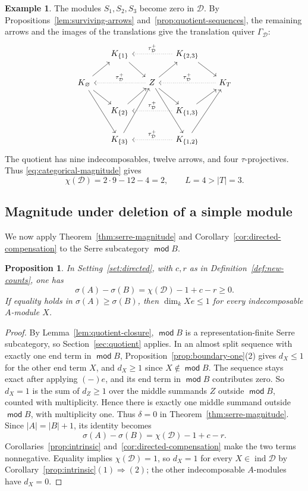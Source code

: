 \documentclass[a4paper,reqno,10pt]{amsart}
\newtheorem{proposition}[theorem]{Proposition}
\theoremstyle{definition}
\newtheorem{example}[theorem]{Example}
\numberwithin{equation}{section}
\DeclareMathOperator{\moduleCategory}{\mathsf{mod}}
\renewcommand{\mod}{\moduleCategory}
\DeclareMathOperator{\ind}{ind}
\newcommand{\cD}{\mathcal D}
\begin{document}
\begin{example}
The modules \(S_1,S_2,S_3\) become zero in \(\cD\). By
Propositions~\ref{lem:surviving-arrows} and~\ref{prop:quotient-sequences},
the remaining arrows and the images of the translations give the
translation quiver \(\Gamma_{\cD}\):
\[
\begin{tikzcd}[column sep=1.6em,row sep=1.7em]
 &K_{\{1\}}\arrow[dr]&&K_{\{2,3\}}\arrow[dr]
   \arrow[ll,dotted,"\tau_{\cD}^+"']&\\
 K_\varnothing\arrow[ur]\arrow[dr]\arrow[ddr]&&
 Z\arrow[ur]\arrow[dr]\arrow[ddr]\arrow[ll,dotted,"\tau_{\cD}^+"']&&
 K_T\arrow[ll,dotted,"\tau_{\cD}^+"']\\
 &K_{\{2\}}\arrow[ur]&&K_{\{1,3\}}\arrow[ur]
   \arrow[ll,dotted,"\tau_{\cD}^+"']&\\
 &K_{\{3\}}\arrow[uur]&&K_{\{1,2\}}\arrow[uur]
   \arrow[ll,dotted,"\tau_{\cD}^+"']&
\end{tikzcd}
\]
The quotient has nine indecomposables, twelve arrows, and four
\(\tau\)-projectives. Thus \eqref{eq:categorical-magnitude} gives
\[
 \chi(\cD)=2\cdot9-12-4=2,\qquad L=4>|T|=3.
\]
\end{example}
\subsection{Magnitude under deletion of a simple module}\label{subsec:deletion-proof}
We now apply Theorem~\ref{thm:serre-magnitude} and
Corollary~\ref{cor:directed-compensation} to the Serre subcategory
\(\mod B\).

\begin{proposition}\label{thm:directed-deletion}
In Setting~\ref{set:directed}, with \(c,r\) as in
Definition~\ref{def:new-counts}, one has
\begin{equation}\label{eq:directed-deletion}
 \sigma(A)-\sigma(B)=\chi(\cD)-1+c-r\geq0.
\end{equation}
If equality holds in \(\sigma(A)\geq\sigma(B)\), then
\(\dim_k Xe\leq1\) for every indecomposable \(A\)-module \(X\).
\end{proposition}

\begin{proof}
By Lemma~\ref{lem:quotient-closure}, \(\mod B\) is a
representation-finite Serre subcategory, so Section~\ref{sec:quotient}
applies. In an almost split sequence with exactly one end term in \(\mod B\),
Proposition~\ref{prop:boundary-one}(2) gives \(d_X\leq1\) for the other
end term \(X\), and \(d_X\geq1\) since \(X\notin\mod B\). The sequence
stays exact after applying \((-)e\), and its end term in \(\mod B\)
contributes zero. So \(d_X=1\) is the sum of \(d_Z\geq1\) over the middle
summands \(Z\) outside \(\mod B\), counted with multiplicity. Hence there
is exactly one middle summand outside \(\mod B\), with multiplicity one. Thus \(\delta=0\) in
Theorem~\ref{thm:serre-magnitude}. Since \(|A|=|B|+1\), its identity becomes
\[
 \sigma(A)-\sigma(B)=\chi(\cD)-1+c-r.
\]
Corollaries~\ref{prop:intrinsic} and~\ref{cor:directed-compensation}
make the two terms nonnegative. Equality implies \(\chi(\cD)=1\), so
\(d_X=1\) for every \(X\in\ind\cD\) by
Corollary~\ref{prop:intrinsic}\((1)\Rightarrow(2)\); the other
indecomposable \(A\)-modules have \(d_X=0\).
\end{proof}
\end{document}
